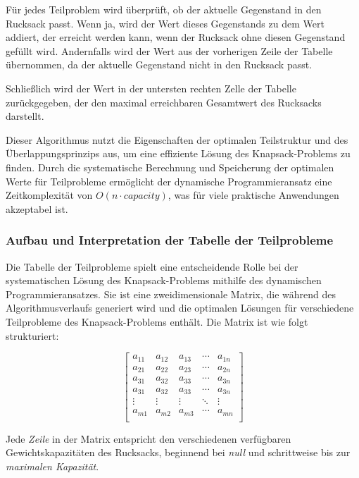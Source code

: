 Für jedes Teilproblem wird überprüft, ob der aktuelle Gegenstand in den Rucksack passt. Wenn ja, wird der Wert dieses
Gegenstands zu dem Wert addiert, der erreicht werden kann, wenn der Rucksack ohne diesen Gegenstand gefüllt wird. Andernfalls
wird der Wert aus der vorherigen Zeile der Tabelle übernommen, da der aktuelle Gegenstand nicht in den Rucksack passt.

Schließlich wird der Wert in der untersten rechten Zelle der Tabelle zurückgegeben, der den maximal erreichbaren Gesamtwert
des Rucksacks darstellt.

Dieser Algorithmus nutzt die Eigenschaften der optimalen Teilstruktur und des Überlappungsprinzips aus, um eine effiziente
Lösung des Knapsack-Problems zu finden. Durch die systematische Berechnung und Speicherung der optimalen Werte für Teilprobleme
ermöglicht der dynamische Programmieransatz eine Zeitkomplexität von \( O(n \cdot capacity) \), was für viele praktische
Anwendungen akzeptabel ist.

\subsubsection*{Aufbau und Interpretation der Tabelle der Teilprobleme}
Die Tabelle der Teilprobleme spielt eine entscheidende Rolle bei der systematischen Lösung des Knapsack-Problems mithilfe
des dynamischen Programmieransatzes. Sie ist eine zweidimensionale Matrix, die während des Algorithmusverlaufs generiert
wird und die optimalen Lösungen für verschiedene Teilprobleme des Knapsack-Problems enthält. Die Matrix ist wie folgt strukturiert:

\[
\left[
\begin{array}{ccccc}
a_{11} & a_{12} & a_{13} & \cdots & a_{1n} \\
a_{21} & a_{22} & a_{23} & \cdots & a_{2n} \\
a_{31} & a_{32} & a_{33} & \cdots & a_{3n} \\
a_{31} & a_{32} & a_{33} & \cdots & a_{3n} \\
\vdots & \vdots & \vdots & \ddots & \vdots \\
a_{m1} & a_{m2} & a_{m3} & \cdots & a_{mn} \\
\end{array}
\right]
\]

Jede \textit{Zeile} in der Matrix entspricht den verschiedenen verfügbaren Gewichtskapazitäten des Rucksacks, beginnend
bei \textit{null} und schrittweise bis zur \textit{maximalen Kapazität}.

